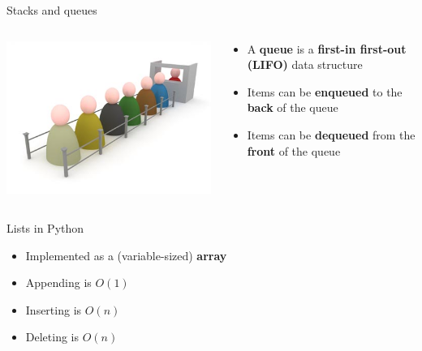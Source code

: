 \begin{frame}{Stacks and queues}
\begin{columns}
\begin{column}{0.3\textwidth}
			\includegraphics[width=\textwidth]{queue}
		\end{column}
		\begin{column}{0.68\textwidth}
			\begin{itemize}
				\item A \textbf{queue} is a \textbf{first-in first-out (LIFO)} data structure
				\pause\item Items can be \textbf{enqueued} to the \textbf{back} of the queue
				\pause\item Items can be \textbf{dequeued} from the \textbf{front} of the queue
			\end{itemize}
		\end{column}
	\end{columns}
\end{frame}

\begin{frame}{Lists in Python}
	\begin{itemize}
		\pause\item Implemented as a (variable-sized) \textbf{array}
		\pause\item Appending is $O(1)$
		\pause\item Inserting is $O(n)$
		\pause\item Deleting is $O(n)$
	\end{itemize}
\end{frame}

